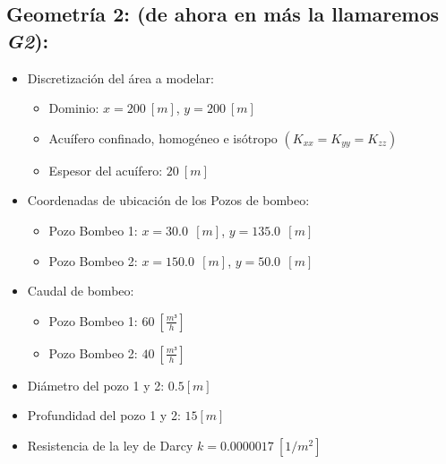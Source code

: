 \documentclass[10pt,a4paper,final]{article}
\begin{document}
\subsection*{Geometría 2: (de ahora en más la llamaremos \emph{G2}):}
\label{geometria2}
\begin{itemize}
	\item Discretización del área a modelar:	
	\begin{itemize}
		\item Dominio: $x=200 ~\left[m\right]$, $y=200 ~\left[m\right]$
		\item Acuífero confinado, homogéneo e isótropo $(K_{xx} = K_{yy} = K_{zz})$
		\item Espesor del acuífero: $20 ~\left[m\right]$
	\end{itemize}
	\item Coordenadas de ubicación de los Pozos de bombeo:
	\begin{itemize}
		\item Pozo Bombeo 1: $x=30.0 ~~\left[m\right]$, $y=135.0 ~~\left[m\right]$
		\item Pozo Bombeo 2: $x=150.0~~\left[m\right]$, $y=50.0 ~~\left[m\right]$
	\end{itemize}
	\item Caudal de bombeo:
	\begin{itemize}
		\item Pozo Bombeo 1: $60~\left[\frac{m³}{h}\right]$
		\item Pozo Bombeo 2: $40~\left[\frac{m³}{h}\right]$
	\end{itemize}
	\item Diámetro del pozo 1 y 2: $0.5 [m]$
	\item Profundidad del pozo 1 y 2: $15 [m]$
	\item Resistencia de la ley de Darcy $k=0.0000017~[1/m^2]$
\end{itemize}
\end{document}
